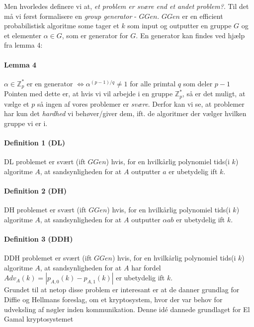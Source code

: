 \documentclass[paper=a4, fontsize=11pt]{scrartcl} %
\numberwithin{equation}{section} %
\numberwithin{figure}{section} %
\numberwithin{table}{section} %
\begin{document}
	Men hvorledes definere vi at, \textit{et problem er svære end et andet problem?}. Til det må vi først formalisere en \textit{group generator} - $GGen$. $GGen$ er en efficient probabilistisk algoritme some tager et $k$ som input og outputter en gruppe $G$ og et elementer $\alpha\in G$, som er generator for $G$. En generator kan findes ved hjælp fra lemma 4:
	
	\paragraph{\textbf{Lemma 4}} $\alpha\in\mathbb{Z}_p^*$ er en generator $\iff \alpha^{(p-1)/q}\not=1$ for alle primtal $q$ som deler $p-1$ \\
	
	Pointen med dette er, at hvis vi vil arbejde i en gruppe $\mathbb{Z}_p^*$, så er det muligt, at vælge et $p$ så ingen af vores problemer er \textit{svære}. Derfor kan vi se, at problemer har kun det \textit{hardhed} vi behøver/giver dem, ift. de algoritmer der vælger hvilken gruppe vi er i.
	
	\paragraph{\textbf{Definition 1 (DL)}} DL problemet er svært (ift $GGen$) hvis, for en hvilkårlig polynomiel tids(i $k$) algoritme $A$, at sandsynligheden for at $A$ outputter $a$ er ubetydelig ift $k$.
	
	\paragraph{\textbf{Definition 2 (DH)}} DH problemet er svært (ift $GGen$) hvis, for en hvilkårlig polynomiel tids(i $k$) algoritme $A$, at sandsynligheden for at $A$ outputter $\alpha{ab}$ er ubetydelig ift $k$.
	
	\paragraph{\textbf{Definition 3 (DDH)}} DDH problemet er svært (ift $GGen$) hvis, for en hvilkårlig polynomiel tids(i $k$) algoritme $A$, at sandsynligheden for at $A$ har fordel $Adv_A(k)=|p_{A,0}(k)-p_{A,1}(k)|$ er ubetydelig ift $k$. \\
	
	Grundet til at netop disse problem er interesant er at de danner grundlag for Diffie og Hellmans foreslag, om et kryptosystem, hvor der var behov for udveksling af nøgler inden kommunikation. Denne idé dannede grundlaget for El Gamal kryptosystemet
	
\end{document}

